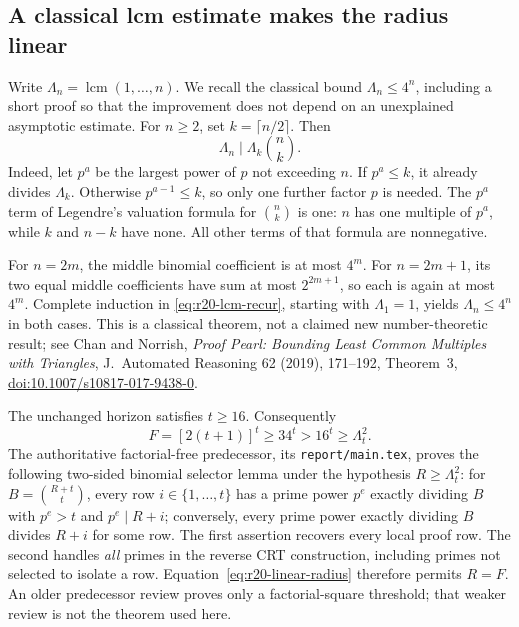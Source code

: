 \subsection{A classical lcm estimate makes the radius linear}
Write $\Lambda_n=\operatorname{lcm}(1,\ldots,n)$.  We recall the classical
bound $\Lambda_n\le4^n$, including a short proof so that the improvement
does not depend on an unexplained asymptotic estimate.  For $n\ge2$, set
$k=\lceil n/2\rceil$.  Then
\begin{equation}\label{eq:r20-lcm-recur}
 \Lambda_n\mid\Lambda_k\binom nk.
\end{equation}
Indeed, let $p^a$ be the largest power of $p$ not exceeding $n$.
If $p^a\le k$, it already divides $\Lambda_k$.  Otherwise
$p^{a-1}\le k$, so only one further factor $p$ is needed.
The $p^a$ term of Legendre's valuation formula for $\binom nk$ is one:
$n$ has one multiple of $p^a$, while $k$ and $n-k$ have none.
All other terms of that formula are nonnegative.

For $n=2m$, the middle binomial coefficient is at most $4^m$.
For $n=2m+1$, its two equal middle coefficients have sum at most
$2^{2m+1}$, so each is again at most $4^m$.  Complete induction in
\eqref{eq:r20-lcm-recur}, starting with $\Lambda_1=1$, yields
$\Lambda_n\le4^n$ in both cases.  This is a classical theorem, not a
claimed new number-theoretic result; see Chan and Norrish,
\emph{Proof Pearl: Bounding Least Common Multiples with Triangles},
J.~Automated Reasoning 62 (2019), 171--192, Theorem~3,
\href{https://doi.org/10.1007/s10817-017-9438-0}{doi:10.1007/s10817-017-9438-0}.

The unchanged horizon satisfies $t\ge16$.  Consequently
\begin{equation}\label{eq:r20-linear-radius}
 F=[2(t+1)]^t\ge34^t>16^t\ge\Lambda_t^2.
\end{equation}
The authoritative factorial-free predecessor, its
\texttt{report/main.tex}, proves the following two-sided binomial selector
lemma under the hypothesis $R\ge\Lambda_t^2$:
for $B=\binom{R+t}{t}$, every row $i\in\{1,\ldots,t\}$ has a prime power
$p^e$ exactly dividing $B$ with $p^e>t$ and $p^e\mid R+i$; conversely,
every prime power exactly dividing $B$ divides $R+i$ for some row.
The first assertion recovers every local proof row.  The second handles
\emph{all} primes in the reverse CRT construction, including primes not
selected to isolate a row.  Equation~\eqref{eq:r20-linear-radius} therefore
permits $R=F$.  An older predecessor review proves only a factorial-square
threshold; that weaker review is not the theorem used here.

